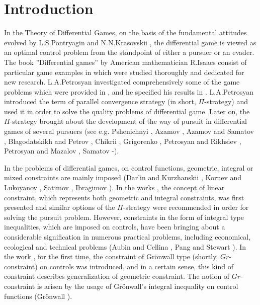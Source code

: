 \documentclass[10 pt]{book}
\begin{document}
\makeatletter
\renewcommand{\@oddhead}{\vbox{\hfill
{\it Akbarov A.~Kh.~ Differential games with H-constraints on the controls... }\hfill \thepage \hrule}}
\renewcommand{\@evenhead}{\vbox{\hfill
{ Bulletin of the Institute of Mathematics, 2022, Vol. 5, \No 6, ISSN-2181-9483}\hfill \thepage \hrule}}

\makeatother
%
\label{firstpage}


\section*{Introduction}
In the Theory of Differential Games, on the basis of the fundamental attitudes evolved by L.S.Pontryagin \cite{1} and
N.N.Krasovskii \cite{2}, the differential game is viewed as an optimal control problem from the standpoint of either
a pursuer or an evader. The book ''Differential games'' \cite{3} by American mathematician R.Isaacs consist of particular game examples in which were studied thoroughly and dedicated for new research. L.A.Petrosyan investigated comprehensively some of the game problems which were provided in \cite{3}, and he specified his results in \cite{4}. L.A.Petrosyan introduced the term of parallel convergence strategy (in short, $\Pi$-strategy) and used it in order to solve the quality problems of differential game. Later on, the $\Pi$-strategy brought about the development of the way of pursuit in differential games of several pursuers
(see e.g. Pshenichnyi \cite{5}, Azamov \cite{6}, Azamov and Samatov \cite{7}, Blagodatskikh and Petrov \cite{8}, Chikrii \cite{9}, Grigorenko \cite{10}, Petrosyan and Rikhsiev \cite{11}, Petrosyan and Mazalov \cite{12}, Samatov \cite{13}-\cite{16}).

In the problems of differential games, on control functions, geometric, integral or mixed constraints are mainly imposed (Dar'in and Kurzhanskii \cite{17}, Kornev and Lukoyanov \cite{18}, Satimov \cite{19}, Ibragimov \cite{20,21}). In the works \cite{13,16}, the concept of linear constraint, which represents both geometric and integral constraints, was first presented and similar options of the $\Pi$-strategy were recommended in order for solving the pursuit problem. However, constraints in the form of integral type inequalities, which are imposed on controls, have been bringing about a considerable signification in numerous practical problems, including economical, ecological and technical problems (Aubin and Cellina \cite{22}, Pang and Stewart \cite{23}). In the work \cite{24}, for the first time, the constraint of Gr\"{o}nwall type (shortly, $Gr$-constraint) on controls was introduced, and in a certain sense, this kind of constraint describes generalization of geometric constraint. The notion of $Gr$-constraint is arisen by the usage of Gr\"{o}nwall's integral inequality on control functions (Gr\"{o}nwall \cite{25}).
\end{document}
